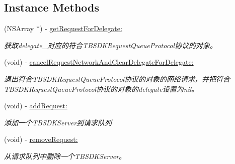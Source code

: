 \subsection*{Instance Methods}
\begin{DoxyCompactItemize}
\item 
\mbox{\label{interface_t_b_s_d_k_server_queue_a9c7f32b1968018f6ace079bd76f8f67d}} 
(N\+S\+Array $\ast$) -\/ \mbox{\hyperlink{interface_t_b_s_d_k_server_queue_a9c7f32b1968018f6ace079bd76f8f67d}{get\+Request\+For\+Delegate\+:}}
\begin{DoxyCompactList}\small\item\em 获取delegate\+\_\+对应的符合\+T\+B\+S\+D\+K\+Request\+Queue\+Protocol协议的对象。 \end{DoxyCompactList}\item 
\mbox{\label{interface_t_b_s_d_k_server_queue_a601e851d54ab2dfea01911a71e272170}} 
(void) -\/ \mbox{\hyperlink{interface_t_b_s_d_k_server_queue_a601e851d54ab2dfea01911a71e272170}{cancel\+Request\+Network\+And\+Clear\+Delegate\+For\+Delegate\+:}}
\begin{DoxyCompactList}\small\item\em 退出符合\+T\+B\+S\+D\+K\+Request\+Queue\+Protocol协议的对象的网络请求，并把符合\+T\+B\+S\+D\+K\+Request\+Queue\+Protocol协议的对象的delegate设置为nil。 \end{DoxyCompactList}\item 
\mbox{\label{interface_t_b_s_d_k_server_queue_a1f49ce0495f9d1b456b167e0b85168ab}} 
(void) -\/ \mbox{\hyperlink{interface_t_b_s_d_k_server_queue_a1f49ce0495f9d1b456b167e0b85168ab}{add\+Request\+:}}
\begin{DoxyCompactList}\small\item\em 添加一个\+T\+B\+S\+D\+K\+Server到请求队列 \end{DoxyCompactList}\item 
\mbox{\label{interface_t_b_s_d_k_server_queue_a9a49c2b4d5d7120147b66cb1f24a4902}} 
(void) -\/ \mbox{\hyperlink{interface_t_b_s_d_k_server_queue_a9a49c2b4d5d7120147b66cb1f24a4902}{remove\+Request\+:}}
\begin{DoxyCompactList}\small\item\em 从请求队列中删除一个\+T\+B\+S\+D\+K\+Server。 \end{DoxyCompactList}\end{DoxyCompactItemize}

